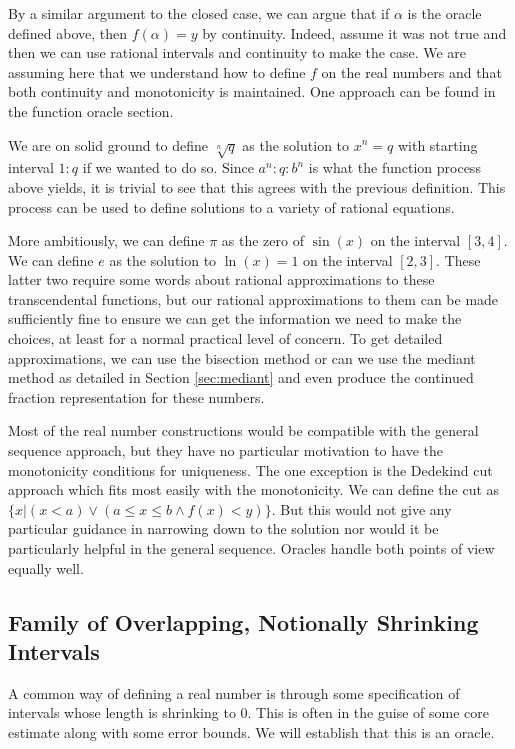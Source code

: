 \documentclass[12pt]{article}
\theoremstyle{remark}
\begin{document}
By a similar argument to the closed case, we can argue that if $\alpha$ is the oracle defined above, then $f(\alpha)=y$ by continuity. Indeed, assume it was not true and then we can use rational intervals and continuity to make the case. We are assuming here that we understand how to define $f$ on the real numbers and that both continuity and monotonicity is maintained. One approach can be found in the function oracle section. 

We are on solid ground to define $\sqrt[n]{q}$ as the solution to $x^n = q$ with starting interval $1:q$ if we wanted to do so. Since $a^n : q: b^n$ is what the function process above yields, it is trivial to see that this agrees with the previous definition. This process can be used to define solutions to a variety of rational equations. 

More ambitiously, we can define $\pi$ as the zero of $\sin(x)$ on the interval $[3,4]$. We can define $e$ as the solution to  $\ln(x)=1$ on the interval $[2,3]$. These latter two require some words about rational approximations to these transcendental functions, but our rational approximations to them can be made sufficiently fine to ensure we can get the information we need to make the choices, at least for a normal practical level of concern.  To get detailed approximations, we can use the bisection method or can we use the mediant method as detailed in Section \ref{sec:mediant} and even produce the continued fraction representation for these numbers.
 
Most of the real number constructions would be compatible with the general sequence approach, but they have no particular motivation to have the monotonicity conditions for uniqueness. The one exception is the Dedekind cut approach which fits most easily with the monotonicity. We can define the cut as $\{x| (x<a) \vee (a \leq x \leq b \wedge f(x) < y) \}$. But this would not give any particular guidance in narrowing down to the solution nor would it be particularly helpful in the general sequence. Oracles handle both points of view equally well. 



\subsection{Family of Overlapping, Notionally Shrinking Intervals} \label{sec:ni}

A common way of defining a real number is through some specification of intervals whose length is shrinking to 0. This is often in the guise of some core estimate along with some error bounds. We will establish that this is an oracle. 
\end{document}
